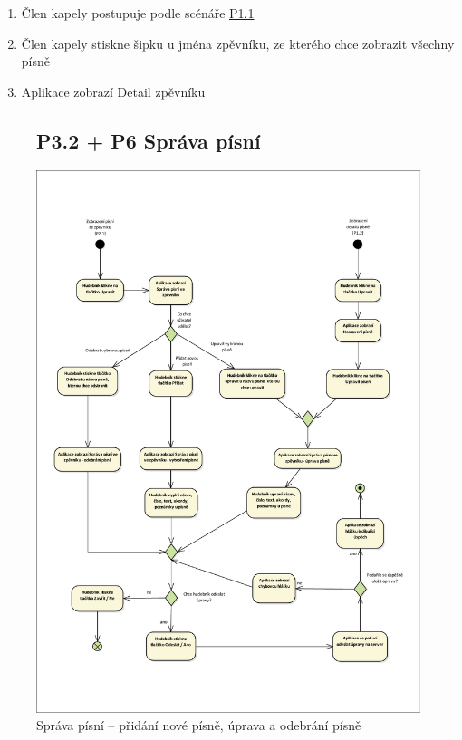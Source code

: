 \begin{enumerate}
    \item Člen kapely postupuje podle scénáře \hyperref[P1.1]{P1.1}
    \item Člen kapely stiskne šipku u jména zpěvníku, ze kterého chce zobrazit všechny písně
    \item Aplikace zobrazí Detail zpěvníku
\end{enumerate}

\begin{figure}
    \subsection{P3.2 + P6 Správa písní}
    \label{P3.2 + P6}
    \centering
    \includegraphics[width=\textwidth-8pt]{images/3-navrh/3-1-uc-sprava-pisni.pdf}
    \caption[Diagram případů užití Správa písní a Správa poznámek k písni]{Správa písní -- přidání nové písně, úprava a odebrání písně}
\end{figure}

